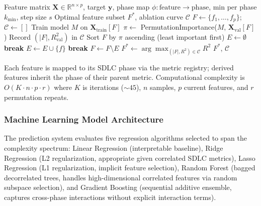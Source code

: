 \documentclass[technologies,article,submit,pdftex,moreauthors]{Definitions/mdpi}
\begin{document}
\begin{algorithm}[H]
\caption{Phase-Aware Recursive Feature Elimination (PA-RFE)}\label{alg:parfe}
\begin{algorithmic}[1]
\Require Feature matrix $\mathbf{X} \in \mathbb{R}^{n \times p}$, target $\mathbf{y}$, phase map $\phi: \text{feature} \rightarrow \text{phase}$, min per phase $k_{\min}$, step size $s$
\Ensure Optimal feature subset $F^*$, ablation curve $\mathcal{C}$
\State $F \leftarrow \{f_1, \ldots, f_p\}$; $\mathcal{C} \leftarrow []$
    \State Train model $M$ on $\mathbf{X}_{\text{train}}[F]$
    \State $\pi \leftarrow$ PermutationImportance($M$, $\mathbf{X}_{\text{val}}[F]$)
    \State Record $(|F|, R^2_{\text{val}})$ in $\mathcal{C}$
    \State Sort $F$ by $\pi$ ascending (least important first)
    \State $E \leftarrow \emptyset$ 
            \State \textbf{break}
        \EndIf
            \State $E \leftarrow E \cup \{f\}$
        \EndIf
    \EndFor
        \State \textbf{break} 
    \EndIf
    \State $F \leftarrow F \setminus E$
\EndWhile
\State $F^* \leftarrow \arg\max_{(|F|, R^2) \in \mathcal{C}} R^2$
\State \Return $F^*$, $\mathcal{C}$
\end{algorithmic}
\end{algorithm}

Each feature is mapped to its SDLC phase via the metric registry; derived features inherit the phase of their parent metric. Computational complexity is \(O(K \cdot n \cdot p \cdot r)\) where \(K\) is iterations (\(\sim 45\)), \(n\) samples, \(p\) current features, and \(r\) permutation repeats.

\subsubsection{Machine Learning Model Architecture}\label{sec:ml_architecture}

The prediction system evaluates five regression algorithms selected to span the complexity spectrum: Linear Regression (interpretable baseline), Ridge Regression (L2 regularization, appropriate given correlated SDLC metrics), Lasso Regression (L1 regularization, implicit feature selection), Random Forest \citep{breiman2001} (bagged decorrelated trees, handles high-dimensional correlated features via random subspace selection), and Gradient Boosting \citep{friedman2001} (sequential additive ensemble, captures cross-phase interactions without explicit interaction terms).
\end{document}
